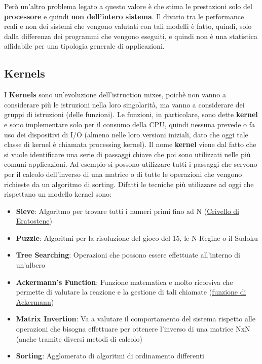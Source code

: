 Però un'altro problema legato a questo valore è che stima le prestazioni solo del \textbf{processore} e quindi \textbf{non dell'intero sistema}. Il divario tra le performance reali e non dei sistemi che vengono valutati con tali modelli è fatto, quindi, solo dalla differenza dei programmi che vengono eseguiti, e quindi non è una statistica affidabile per una tipologia generale di applicazioni.

\subsection{Kernels}
I \textbf{Kernels} sono un'evoluzione dell'istruction mixes, poichè non vanno a considerare più le istruzioni nella loro singolarità, ma vanno a considerare dei gruppi di istruzioni (delle funzioni). Le funzioni, in particolare, sono dette \textbf{kernel} e sono implementare solo per il consumo della CPU, quindi nessuna prevede o fa uso dei dispositivi di I/O (almeno nelle loro versioni iniziali, dato che oggi tale classe di kernel è chiamata processing kernel). Il nome \textbf{kernel} viene dal fatto che si vuole identificare una serie di passaggi chiave che poi sono utilizzati nelle più comuni applicazioni. Ad esempio si possono utilizzare tutti i passaggi che servono per il calcolo dell'inverso di una matrice o di tutte le operazioni che vengono richieste da un algoritmo di sorting. Difatti le tecniche più utilizzare ad oggi che rispettano un modello kernel sono:
\begin{itemize}
    \item \textbf{Sieve}: Algoritmo per trovare tutti i numeri primi fino ad N (\href{https://it.wikipedia.org/wiki/Crivello_di_Eratostene}{Crivello di Eratostene})
    \item \textbf{Puzzle}: Algoritmi per la risoluzione del gioco del 15, le N-Regine o il Sudoku
    \item \textbf{Tree Searching}: Operazioni che possono essere effettuate all'interno di un'albero
    \item \textbf{Ackermann's Function}: Funzione matematica e molto ricorsiva che permette di valutare la reazione e la gestione di tali chiamate (\href{https://it.wikipedia.org/wiki/Funzione_di_Ackermann}{funzione di Ackermann})
    \item \textbf{Matrix Invertion}: Va a valutare il comportamento del sistema rispetto alle operazioni che bisogna effettuare per ottenere l'inverso di una matrice NxN (anche tramite diversi metodi di calcolo)
    \item \textbf{Sorting}: Agglomerato di algoritmi di ordinamento differenti
\end{itemize}

